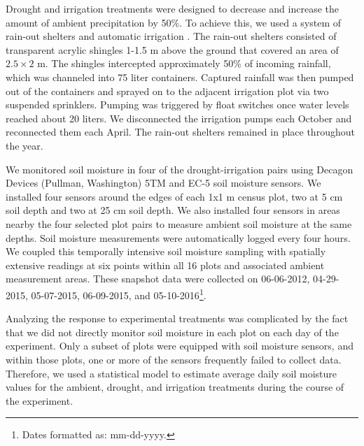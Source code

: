 \documentclass[fleqn,10pt,lineno]{wlpeerj} %
\begin{document}
Drought and irrigation treatments were designed to decrease and increase
the amount of ambient precipitation by 50\%. To achieve this, we used a
system of rain-out shelters and automatic irrigation
\citep{Gherardi2013}. The rain-out shelters consisted of transparent
acrylic shingles 1-1.5 m above the ground that covered an area of
\(2.5\times2\) m. The shingles intercepted approximately 50\% of
incoming rainfall, which was channeled into 75 liter containers.
Captured rainfall was then pumped out of the containers and sprayed on
to the adjacent irrigation plot via two suspended sprinklers. Pumping
was triggered by float switches once water levels reached about 20
liters. We disconnected the irrigation pumps each October and
reconnected them each April. The rain-out shelters remained in place
throughout the year.

We monitored soil moisture in four of the drought-irrigation pairs using
Decagon Devices (Pullman, Washington) 5TM and EC-5 soil moisture
sensors. We installed four sensors around the edges of each 1x1 m census
plot, two at 5 cm soil depth and two at 25 cm soil depth. We also
installed four sensors in areas nearby the four selected plot pairs to
measure ambient soil moisture at the same depths. Soil moisture
measurements were automatically logged every four hours. We coupled this
temporally intensive soil moisture sampling with spatially extensive
readings  at six points within
all 16 plots and associated ambient measurement areas. These snapshot
data were collected on 06-06-2012, 04-29-2015, 05-07-2015, 06-09-2015,
and 05-10-2016\footnote{Dates formatted as: mm-dd-yyyy.}.

Analyzing the response to experimental treatments was complicated by the
fact that we did not directly monitor soil moisture in each plot on each
day of the experiment. Only a subset of plots were equipped with soil
moisture sensors, and within those plots, one or more of the sensors
frequently failed to collect data. Therefore, we used a statistical
model to estimate average daily soil moisture values for the ambient,
drought, and irrigation treatments during the course of the experiment.
\end{document}
